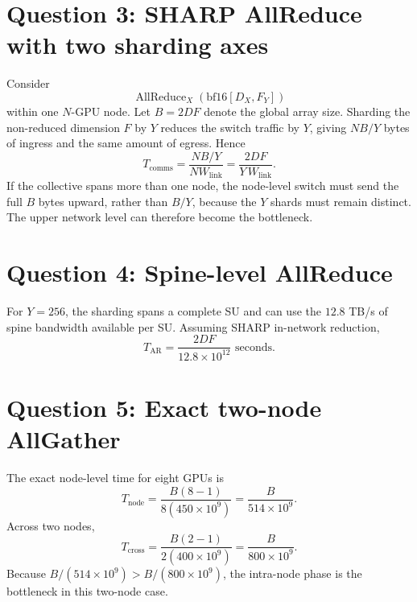 \documentclass[11pt]{article}
\begin{document}
\section*{Question 3: SHARP AllReduce with two sharding axes}

Consider
\[
\operatorname{AllReduce}_X\!
\left(\mathrm{bf16}[D_X,F_Y]\right)
\]
within one \(N\)-GPU node.  Let \(B=2DF\) denote the global array size.
Sharding the non-reduced dimension \(F\) by \(Y\) reduces the switch traffic
by \(Y\), giving \(NB/Y\) bytes of ingress and the same amount of egress.
Hence
\[
\boxed{
T_{\mathrm{comms}}
=\frac{NB/Y}{NW_{\mathrm{link}}}
=\frac{2DF}{Y\,W_{\mathrm{link}}}.}
\]
If the collective spans more than one node, the node-level switch must
send the full \(B\) bytes upward, rather than \(B/Y\), because the \(Y\)
shards must remain distinct.  The upper network level can therefore become
the bottleneck.

\section*{Question 4: Spine-level AllReduce}

For \(Y=256\), the sharding spans a complete SU and can use the
\(12.8\) TB/s of spine bandwidth available per SU.  Assuming SHARP
in-network reduction,
\[
\boxed{
T_{\mathrm{AR}}
=\frac{2DF}{12.8\times10^{12}}\text{ seconds}.}
\]

\section*{Question 5: Exact two-node AllGather}

The exact node-level time for eight GPUs is
\[
T_{\mathrm{node}}
=\frac{B(8-1)}{8(450\times10^9)}
=\boxed{\frac{B}{514\times10^9}}.
\]
Across two nodes,
\[
T_{\mathrm{cross}}
=\frac{B(2-1)}{2(400\times10^9)}
=\boxed{\frac{B}{800\times10^9}}.
\]
Because \(B/(514\times10^9)>B/(800\times10^9)\), the intra-node phase is
the bottleneck in this two-node case.
\end{document}
